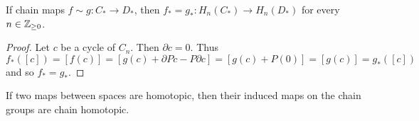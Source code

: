 \begin{center}
\end{center}

\begin{proposition}
	If chain maps $f \sim g: C_* \to D_*$, then $f_* = g_*: H_n(C_*) \to H_n(D_*)$ for every $n \in \mathbb{Z}_{\geq 0}$.
\end{proposition}

\begin{proof}
	Let $c$ be a cycle of $C_n$. Then $\partial c = 0$. Thus
	\[
		f_*([c])
		= [f(c)]
		= [g(c) + \partial Pc - P\partial c]
		= [g(c) + P(0)]
		= [g(c)]
		= g_*([c])
	\]
	and so $f_* = g_*$.
\end{proof}

\begin{theorem}
	If two maps between spaces are homotopic, then their induced maps on the chain groups are chain homotopic.
\end{theorem}

